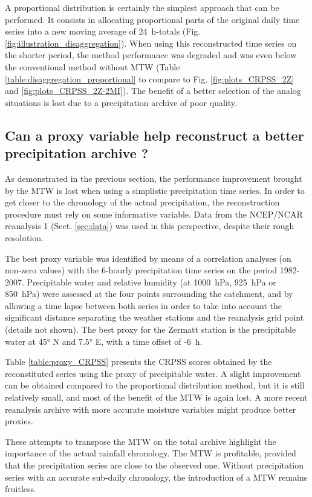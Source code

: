 \documentclass[hess, manuscript]{copernicus}
\begin{document}
A proportional distribution is certainly the simplest approach that can be performed. It consists in allocating proportional parts of the original daily time series into a new moving average of 24~h-totals (Fig. \ref{fig:illustration_disaggregation}). When using this reconstructed time series on the shorter period, the method performance was degraded and was even below the conventional method without MTW (Table \ref{table:disaggregation_proportional} to compare to Fig. \ref{fig:plots_CRPSS_2Z} and \ref{fig:plots_CRPSS_2Z-2MI}). The benefit of a better selection of the analog situations is lost due to a precipitation archive of poor quality.

\subsection{Can a proxy variable help reconstruct a better precipitation archive ?}

As demonstrated in the previous section, the performance improvement brought by the MTW is lost when using a simplistic precipitation time series. In order to get closer to the chronology of the actual precipitation, the reconstruction procedure must rely on some informative variable. Data from the NCEP/NCAR reanalysis 1 (Sect. \ref{sec:data}) was used in this perspective, despite their rough resolution.

The best proxy variable was identified by means of a correlation analyses (on non-zero values) with the 6-hourly precipitation time series on the period 1982-2007. Precipitable water and relative humidity (at 1000~hPa, 925~hPa or 850~hPa) were assessed at the four points surrounding the catchment, and by allowing a time lapse between both series in order to take into account the significant distance separating the weather stations and the reanalysis grid point (details not shown). The best proxy for the Zermatt station is the precipitable water at 45° N and 7.5° E, with a time offset of -6~h.

Table \ref{table:proxy_CRPSS} presents the CRPSS scores obtained by the reconstituted series using the proxy of precipitable water. A slight improvement can be obtained compared to the proportional distribution method, but it is still relatively small, and most of the benefit of the MTW is again lost. A more recent reanalysis archive with more accurate moisture variables might produce better proxies.

These attempts to transpose the MTW on the total archive highlight the importance of the actual rainfall chronology. The MTW is profitable, provided that the precipitation series are close to the observed one. Without precipitation series with an accurate sub-daily chronology, the introduction of a MTW remains fruitless.
\end{document}
